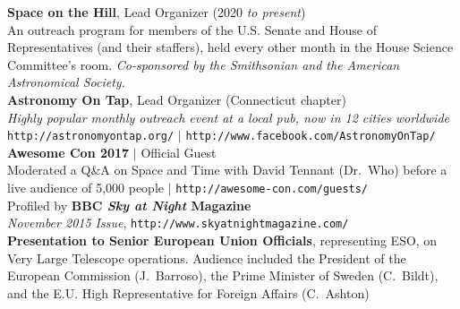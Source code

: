 \documentclass[11pt]{article}
\begin{document}
{%


\textbf{Space on the Hill}, Lead Organizer (2020 \textit{to present}) \\
An outreach program for members of the U.S. Senate and House of Representatives (and their staffers), held every other month in the House Science Committee's room. \textit{ Co-sponsored by the Smithsonian and the American Astronomical Society.}\\

\textbf{Astronomy On Tap}, Lead Organizer (Connecticut chapter) \\
\textit{Highly popular monthly outreach event at a local pub, now in 12 cities worldwide} \\
{\footnotesize \texttt{http://astronomyontap.org/}} $|$ {\footnotesize \texttt{http://www.facebook.com/AstronomyOnTap/}} \\


\textbf{Awesome Con 2017} $|$ Official Guest \\
Moderated a Q\&A on Space and Time with David Tennant (Dr.~Who) before a live audience of 5,000 people $|$ \texttt{http://awesome-con.com/guests/}  \\



Profiled by \textbf{BBC \textit{Sky at Night} Magazine} \\ \textit{November 2015 Issue},
{\footnotesize \texttt{http://www.skyatnightmagazine.com/}}\\

\textbf{Presentation to Senior European Union Officials}, representing ESO, on Very Large Telescope operations. Audience included
the President of the European Commission (J.~Barroso), the Prime Minister of Sweden (C.~Bildt), and the
E.U. High Representative for Foreign Affairs (C.~Ashton) \\ }
\end{document}
